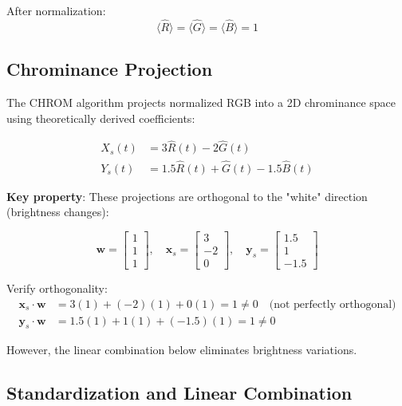 \documentclass[11pt,a4paper]{article}
\newcommand{\vect}[1]{\bm{#1}}
\begin{document}
After normalization:
\begin{equation}
\langle \hat{R} \rangle = \langle \hat{G} \rangle = \langle \hat{B} \rangle = 1
\end{equation}

\subsection{Chrominance Projection}

The CHROM algorithm projects normalized RGB into a 2D chrominance space using theoretically derived coefficients:

\begin{align}
X_s(t) &= 3\hat{R}(t) - 2\hat{G}(t) \\
Y_s(t) &= 1.5\hat{R}(t) + \hat{G}(t) - 1.5\hat{B}(t)
\end{align}

\textbf{Key property}: These projections are orthogonal to the "white" direction (brightness changes):

\begin{equation}
\vect{w} = \begin{bmatrix} 1 \\ 1 \\ 1 \end{bmatrix}, \quad
\vect{x}_s = \begin{bmatrix} 3 \\ -2 \\ 0 \end{bmatrix}, \quad
\vect{y}_s = \begin{bmatrix} 1.5 \\ 1 \\ -1.5 \end{bmatrix}
\end{equation}

Verify orthogonality:
\begin{align}
\vect{x}_s \cdot \vect{w} &= 3(1) + (-2)(1) + 0(1) = 1 \neq 0 \quad \text{(not perfectly orthogonal)} \\
\vect{y}_s \cdot \vect{w} &= 1.5(1) + 1(1) + (-1.5)(1) = 1 \neq 0
\end{align}

However, the linear combination below eliminates brightness variations.

\subsection{Standardization and Linear Combination}
\end{document}
